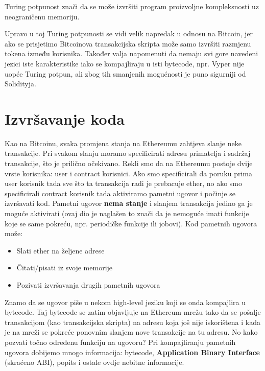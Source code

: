 \documentclass[a4paper,oneside,12pt]{memoir} %
\begin{document}
\begin{napomena}
Turing potpunost znači da se može izvršiti program proizvoljne kompleksnosti uz neograničenu memoriju.
\end{napomena}

Upravo u toj Turing potpunosti se vidi velik napredak u odnosu na Bitcoin, jer ako se prisjetimo Bitcoinova transakcijska skripta može samo izvršiti razmjenu tokena između korisnika. Također valja napomenuti da nemaju svi gore navedeni jezici iste karakteristike iako se kompajliraju u isti bytecode, npr. Vyper nije uopće Turing potpun, ali zbog tih smanjenih mogućnosti je puno sigurniji od Solidityja.

\section{Izvršavanje koda}

Kao na Bitcoinu, svaka promjena stanja na Ethereumu zahtjeva slanje neke transakcije. Pri svakom slanju moramo specificirati adresu primatelja i sadržaj transakcije, što je prilično očekivano. Rekli smo da na Ethereumu postoje dvije vrste korisnika: user i contract korisnici. Ako smo specificirali da poruku prima user korisnik tada sve što ta transakcija radi je prebacuje ether, no ako smo specificirali contract korisnik tada aktiviramo pametni ugovor i počinje se izvršavati kod. Pametni ugovor \textbf{nema stanje} i slanjem transakcija jedino ga je moguće aktivirati (ovaj dio je naglašen to znači da je nemoguće imati funkcije koje se same pokreću, npr. periodičke funkcije ili jobovi). Kod pametnih ugovora može:

\begin{itemize}
    \item Slati ether na željene adrese
    \item Čitati/pisati iz svoje memorije
    \item Pozivati izvršavanja drugih pametnih ugovora
\end{itemize}

Znamo da se ugovor piše u nekom high-level jeziku koji se onda kompajlira u bytecode. Taj bytecode se zatim objavljuje na Ethereum mrežu tako da se pošalje transakcijom (kao transakcijska skripta) na adresu koja još nije iskorištena i kada je na mreži se pokreće ponovnim slanjem nove transakcije na tu adresu. No kako pozvati točno određenu funkciju na ugovoru? Pri kompajliranju pametnih ugovora dobijemo mnogo informacija: bytecode,  \textbf{Application Binary Interface} (skraćeno ABI), popits i ostale ovdje nebitne informacije.
\end{document}
